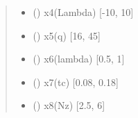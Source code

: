 \documentclass[letterpaper,10pt,english,openany,oneside]{sphinxmanual}
\begin{document}
\begin{fulllineitems}
\begin{quote}
\begin{description}
\begin{itemize}
\item {} 
\sphinxstyleliteralstrong{\sphinxupquote{{[}}}\sphinxstyleliteralstrong{\sphinxupquote{{]}}} (\sphinxstyleliteralemphasis{\sphinxupquote{ {[}}}\sphinxstyleliteralemphasis{\sphinxupquote{{]}}}) \textendash{} x4(Lambda) {[}-10, 10{]}

\item {} 
\sphinxstyleliteralstrong{\sphinxupquote{{[}}}\sphinxstyleliteralstrong{\sphinxupquote{{]}}} (\sphinxstyleliteralemphasis{\sphinxupquote{ {[}}}\sphinxstyleliteralemphasis{\sphinxupquote{{]}}}) \textendash{} x5(q) {[}16, 45{]}

\item {} 
\sphinxstyleliteralstrong{\sphinxupquote{{[}}}\sphinxstyleliteralstrong{\sphinxupquote{{]}}} (\sphinxstyleliteralemphasis{\sphinxupquote{ {[}}}\sphinxstyleliteralemphasis{\sphinxupquote{{]}}}) \textendash{} x6(lambda) {[}0.5, 1{]}

\item {} 
\sphinxstyleliteralstrong{\sphinxupquote{{[}}}\sphinxstyleliteralstrong{\sphinxupquote{{]}}} (\sphinxstyleliteralemphasis{\sphinxupquote{ {[}}}\sphinxstyleliteralemphasis{\sphinxupquote{{]}}}) \textendash{} x7(tc) {[}0.08, 0.18{]}

\item {} 
\sphinxstyleliteralstrong{\sphinxupquote{{[}}}\sphinxstyleliteralstrong{\sphinxupquote{{]}}} (\sphinxstyleliteralemphasis{\sphinxupquote{ {[}}}\sphinxstyleliteralemphasis{\sphinxupquote{{]}}}) \textendash{} x8(Nz) {[}2.5, 6{]}


\end{itemize}
\end{description}
\end{quote}
\end{fulllineitems}
\end{document}
